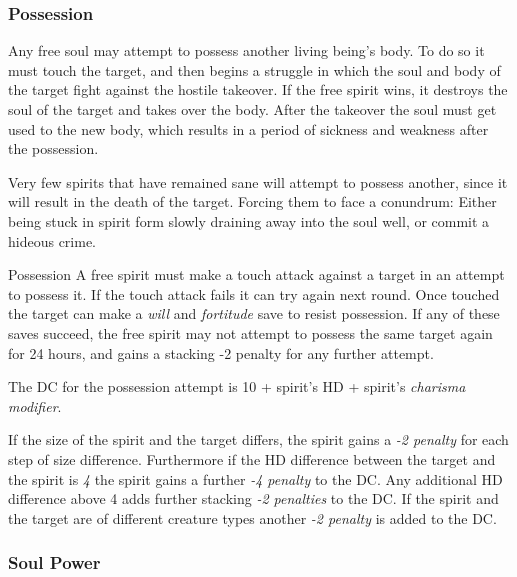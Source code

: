 \subsubsection{Possession}
\label{sec:Possession}

Any free soul may attempt to possess another living being's body. To do so
it must touch the target, and then begins a struggle in which the soul and
body of the target fight against the hostile takeover. If the free spirit
wins, it destroys the soul of the target and takes over the body. After the
takeover the soul must get used to the new body, which results in a period
of sickness and weakness after the possession.

Very few spirits that have remained sane will attempt to possess another, since
it will result in the death of the target. Forcing them to face a conundrum:
Either being stuck in spirit form slowly draining away into the soul well,
or commit a hideous crime.


\begin{35e}{Possession}
  A free spirit must make a touch attack against a target in an attempt to
  possess it. If the touch attack fails it can try again next round. Once
  touched the target can make a \emph{will} and \emph{fortitude} save to
  resist possession. If any of these saves succeed, the free spirit may not
  attempt to possess the same target again for 24 hours, and gains a stacking
  -2 penalty for any further attempt.

  The DC for the possession attempt is 10 +  spirit's HD +
  spirit's \emph{charisma modifier}.

  If the size of the spirit and the target differs, the spirit gains a
  \emph{-2 penalty} for each step of size difference. Furthermore if the
  HD difference between the target and the spirit is \emph{4} the spirit gains
  a further \emph{-4 penalty} to the DC. Any additional HD difference above
  4 adds further stacking \emph{-2 penalties} to the DC. If the spirit and
  the target are of different creature types another \emph{-2 penalty} is
  added to the DC.
\end{35e}

\subsubsection{Soul Power}
\label{sec:Soul Power}

